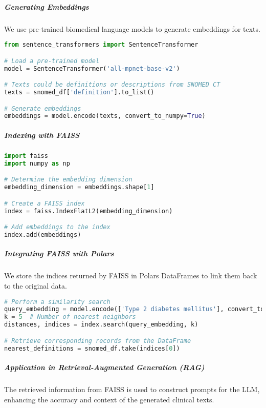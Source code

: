 \documentclass[12pt, a4paper]{article}
\begin{document}
\subparagraph{Generating Embeddings}

We use pre-trained biomedical language models to generate embeddings for texts.

\begin{lstlisting}[language=Python, caption=Generating embeddings using SentenceTransformer, label=lst:generate_embeddings]
from sentence_transformers import SentenceTransformer

# Load a pre-trained model
model = SentenceTransformer('all-mpnet-base-v2')

# Texts could be definitions or descriptions from SNOMED CT
texts = snomed_df['definition'].to_list()

# Generate embeddings
embeddings = model.encode(texts, convert_to_numpy=True)
\end{lstlisting}

\subparagraph{Indexing with FAISS}

\begin{lstlisting}[language=Python, caption=Creating a FAISS index for embeddings, label=lst:faiss_index]
import faiss
import numpy as np

# Determine the embedding dimension
embedding_dimension = embeddings.shape[1]

# Create a FAISS index
index = faiss.IndexFlatL2(embedding_dimension)

# Add embeddings to the index
index.add(embeddings)
\end{lstlisting}

\subparagraph{Integrating FAISS with Polars}

We store the indices returned by FAISS in Polars DataFrames to link them back to the original data.

\begin{lstlisting}[language=Python, caption=Retrieving data using FAISS indices, label=lst:faiss_retrieval]
# Perform a similarity search
query_embedding = model.encode(['Type 2 diabetes mellitus'], convert_to_numpy=True)
k = 5  # Number of nearest neighbors
distances, indices = index.search(query_embedding, k)

# Retrieve corresponding records from the DataFrame
nearest_definitions = snomed_df.take(indices[0])
\end{lstlisting}

\subparagraph{Application in Retrieval-Augmented Generation (RAG)}

The retrieved information from FAISS is used to construct prompts for the LLM, enhancing the accuracy and context of the generated clinical texts.
\end{document}
